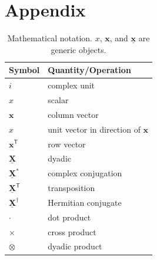 \documentclass[12pt]{article}
\numberwithin{equation}{subsection}
\let\oldsection\section%
\renewcommand{\section}{%
  \renewcommand{\theequation}{\thesection.\arabic{equation}}%
  \oldsection}%
\renewcommand{\vec}[1]{\boldsymbol{#1}}
\newcommand{\tensor}[1]{\underline{\boldsymbol{#1}}} %
\newcommand{\T}{^{\mathsf{T}}}%
\begin{document}
\section*{Appendix}
\begin{table}[H]
\centering
\begin{tabular}{ l | l} 
	\textbf{Symbol} & \textbf{Quantity/Operation} \\
	\hline\hline
	$i$ & complex unit\\
	$x$ & scalar\\		
	$\vec{x}$ & column vector\\
	$\hat{x}$ & unit vector in direction of $\boldsymbol{x}$\\
	$\boldsymbol x\T$ & row vector\\
	$\tensor{X}$ & dyadic\\		
	$\tensor{X}^*$ & complex conjugation\\
	$\tensor{X}\T$ & transposition\\
	$\tensor{X}^\dagger$ & Hermitian conjugate\\	
	$\cdot$ & dot product\\
	$\times$ & cross product\\
	$\otimes$ & dyadic product
\end{tabular}
\caption{Mathematical notation. $x$, $\boldsymbol{x}$, and $\underline{\boldsymbol{x}}$ are generic objects.}
\label{notation}
\end{table} 
\end{document}
